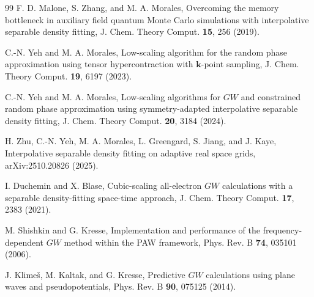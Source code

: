 \documentclass[aps,prb,reprint,superscriptaddress,longbibliography,nofootinbib]{revtex4-2}
\begin{document}
\begin{thebibliography}{99}
F. D. Malone, S. Zhang, and M. A. Morales, Overcoming the memory bottleneck in auxiliary field quantum Monte Carlo simulations with interpolative separable density fitting, J. Chem. Theory Comput. \textbf{15}, 256 (2019).

C.-N. Yeh and M. A. Morales, Low-scaling algorithm for the random phase approximation using tensor hypercontraction with \(\mathbf k\)-point sampling, J. Chem. Theory Comput. \textbf{19}, 6197 (2023).

C.-N. Yeh and M. A. Morales, Low-scaling algorithms for \(GW\) and constrained random phase approximation using symmetry-adapted interpolative separable density fitting, J. Chem. Theory Comput. \textbf{20}, 3184 (2024).

H. Zhu, C.-N. Yeh, M. A. Morales, L. Greengard, S. Jiang, and J. Kaye, Interpolative separable density fitting on adaptive real space grids, arXiv:2510.20826 (2025).

I. Duchemin and X. Blase, Cubic-scaling all-electron \(GW\) calculations with a separable density-fitting space-time approach, J. Chem. Theory Comput. \textbf{17}, 2383 (2021).

M. Shishkin and G. Kresse, Implementation and performance of the frequency-dependent \(GW\) method within the PAW framework, Phys. Rev. B \textbf{74}, 035101 (2006).

J. Klime\v{s}, M. Kaltak, and G. Kresse, Predictive \(GW\) calculations using plane waves and pseudopotentials, Phys. Rev. B \textbf{90}, 075125 (2014).

\end{thebibliography}
\end{document}
